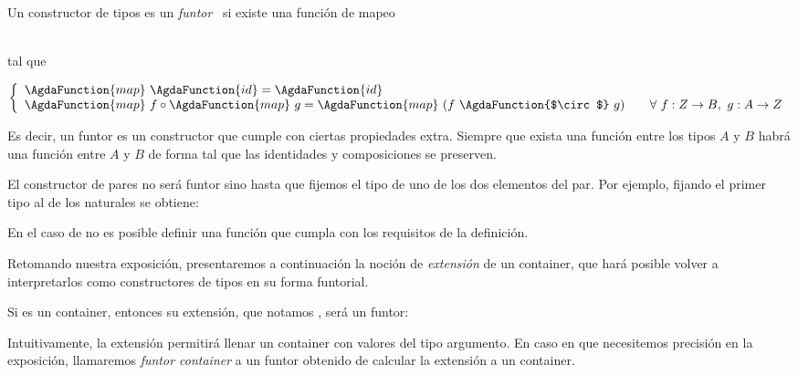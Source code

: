 \begin{definition} \label{def:funtor}
  Un constructor de tipos  \AgdaSymbol{:}  \AgdaSymbol{$\to$}  es un {\it funtor}~\cite{plotkin+reynolds} si existe una función de mapeo

 \\
 tal que

 \sangrar
 $
 \left \{ \begin{array}{ll}
 \AgdaFunction{map}\ \AgdaFunction{id} = \AgdaFunction{id} &
 \\ \AgdaFunction{map}\ f \circ \AgdaFunction{map}\ g = \AgdaFunction{map}\ (f\ \AgdaFunction{$\circ$}\ g) & \quad \forall\ f :  Z \to B,\ g : A \to Z
 \end{array}
 \right. 
 $
 
Es decir, un funtor es un constructor  que cumple con ciertas propiedades extra. Siempre que exista una función entre los tipos $A$ y $B$ habrá una función entre  $A$ y  $B$ de forma tal que las identidades y composiciones se preserven. 
 
\end{definition}

\vspace{1ex}

El constructor de pares 
no será funtor sino hasta que fijemos el tipo de uno de los dos elementos del par. Por ejemplo, fijando el primer tipo al de los naturales se obtiene:


En el caso de  no es posible definir una función  que cumpla con los requisitos de la definición.
 
\vspace{1ex}

Retomando nuestra exposición, presentaremos a continuación
la noción de {\it extensión} de un container, que hará posible volver a interpretarlos como constructores de tipos en su forma funtorial.

Si  \AgdaSymbol{:}  es un container, entonces su extensión, que notamos , será un funtor:

\sangrar
{} \AgdaSymbol{:}  \AgdaSymbol{$\to$} 

Intuitivamente, la extensión permitirá llenar un container con valores del tipo argumento.
En caso en que necesitemos precisión en la exposición, llamaremos {\it funtor container} a un funtor obtenido de calcular la extensión a un container. 

